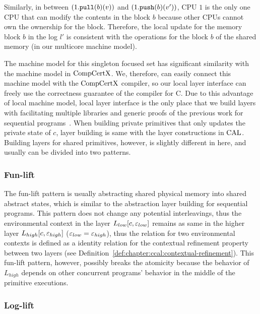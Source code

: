 Similarly,  in between $(1.{\mathrm{\texttt{pull}}}(b)(v))$ and $(1.{\mathrm{\texttt{push}}}(b)(v'))$, 
CPU $1$ is the only one CPU that can modify the contents in the block $b$
because other CPUs cannot own the ownership for the block.
Therefore, the local update for the memory block $b$ in the log $l'$ 
is consistent with the operations for the block $b$ of the shared memory (in our multicore machine model).

The machine model for this singleton focused set has significant similarity with the machine model in $\mathrm{CompCertX}$. 
We, therefore, can easily connect this machine model with the $\mathrm{CompCertX}$ compiler, 
so our local layer interface can freely use the correctness guarantee of the compiler for C. 
Due to this advantage of local machine model, local layer interface is the only place that we build layers with facilitating multiple libraries and generic proofs of the previous work for sequential programs~\cite{deepspec}. 
When building private primitives that only updates the private state of $c$, 
layer building is same with the layer constructions in $\mathrm{CAL}$.
Building layers for shared primitives, however, is slightly different in here, and usually can be divided into 
two patterns.

\subsubsection{Fun-lift}
The fun-lift pattern is usually abstracting shared physical memory into shared abstract states,
which is similar to the abstraction layer building for sequential programs.
This pattern does not change any potential interleavings, 
thus the environmental context in the layer $L_{low}[c, {\varepsilon}_{low}]$ remains 
as same in the higher layer $L_{high}[c, {\varepsilon}_{high}]$ (${\varepsilon}_{low} = {\varepsilon}_{high}$), thus the 
relation for two environmental contexts is defined as a identity relation 
for the contextual refinement property between two layers (see Definition~\ref{def:chapter:ccal:contextual-refinement}).
This fun-lift pattern, however, possibly breaks the atomicity because the behavior of $L_{high}$ depends on other concurrent programs’ behavior in the middle of the primitive executions. 

\subsubsection{Log-lift}

